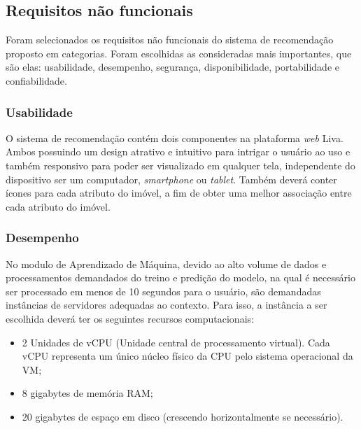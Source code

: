 \subsection{Requisitos não funcionais}

Foram selecionados os requisitos não funcionais do sistema de recomendação proposto em categorias. Foram escolhidas as consideradas mais importantes, que são elas: usabilidade, desempenho, segurança, disponibilidade, portabilidade e confiabilidade.

\subsubsection{Usabilidade}

O sistema de recomendação contém dois componentes na plataforma \textit{web} Liva. Ambos possuindo um design atrativo e intuitivo para intrigar o usuário ao uso e também responsivo para poder ser visualizado em qualquer tela, independente do dispositivo ser um computador, \textit{smartphone} ou \textit{tablet}. Também deverá conter ícones para cada atributo do imóvel, a fim de obter uma melhor associação entre cada atributo do imóvel.


\subsubsection{Desempenho}
\label{desempenho}

No modulo de Aprendizado de Máquina, devido ao alto volume de dados e processamentos demandados do treino e predição do modelo, na qual é necessário ser processado em menos de 10 segundos para o usuário, são demandadas instâncias de servidores adequadas ao contexto. Para isso, a instância a ser escolhida deverá ter os seguintes recursos computacionais:

\begin{itemize}
    \item 2 Unidades de vCPU (Unidade central de processamento virtual). Cada vCPU representa um único núcleo físico da CPU pelo sistema operacional da VM;
    \item 8 gigabytes de memória RAM;
    \item 20 gigabytes de espaço em disco (crescendo horizontalmente se necessário).
\end{itemize}

